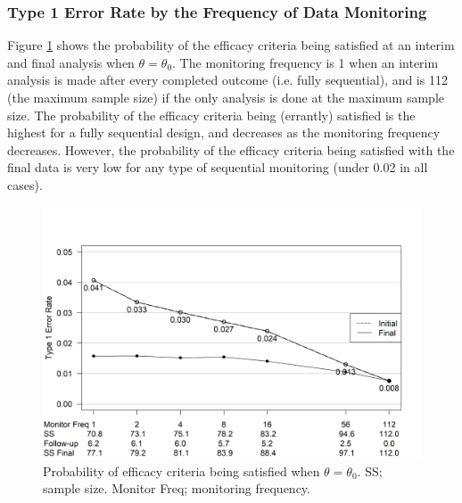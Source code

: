 \documentclass[useAMS,usenatbib,referee]{biom}
\begin{document}
\subsubsection{Type 1 Error Rate by the Frequency of Data Monitoring}
Figure \ref{fig:ex1t1e} shows the probability of the efficacy criteria being satisfied at an interim and final analysis when $\theta=\theta_0$. 
%
The monitoring frequency is 1 when an interim analysis is made after every completed outcome (i.e. fully sequential), and is 112 (the maximum sample size) if the only analysis is done at the maximum sample size. 
%
The probability of the efficacy criteria being (errantly) satisfied is the highest for a fully sequential design, and decreases as the monitoring frequency decreases. However, the probability of the efficacy criteria being satisfied with the final data is very low for any type of sequential monitoring (under 0.02 in all cases).
\begin{figure}\begin{center}

    \includegraphics[width=6in]{figure4.png}
    \caption{Probability of efficacy criteria being satisfied when $\theta=\theta_0$. SS; sample size. Monitor Freq; monitoring frequency.}
	\label{fig:ex1t1e}

 
\end{center}
\end{figure}
\end{document}
